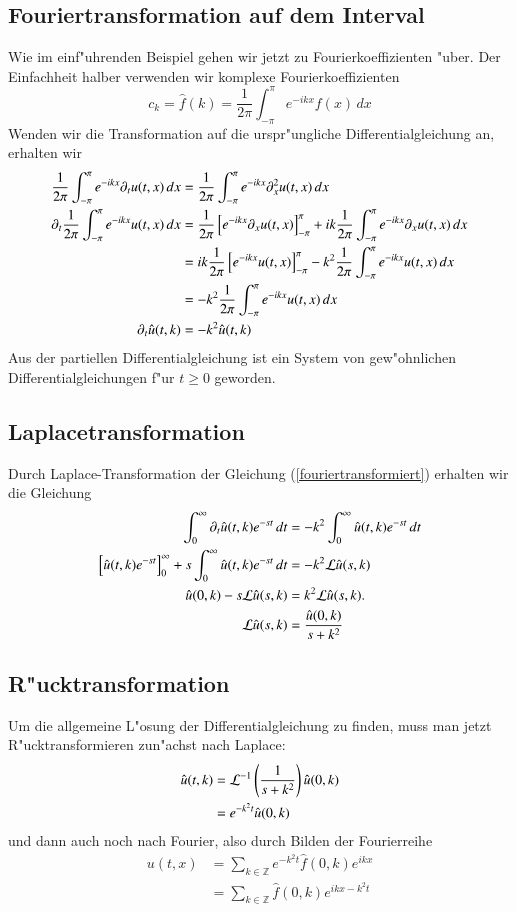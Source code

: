 \subsection{Fouriertransformation auf dem Interval}
Wie im einf"uhrenden Beispiel gehen wir jetzt zu Fourierkoeffizienten
"uber.
Der Einfachheit halber verwenden wir komplexe Fourierkoeffizienten
\[
c_k=\hat f(k)=\frac1{2\pi}\int_{-\pi}^{\pi}e^{-ikx}f(x)\,dx
\]
Wenden wir die Transformation auf die urspr"ungliche Differentialgleichung
an, erhalten wir
\begin{align}
\frac1{2\pi}\int_{-\pi}^{\pi}e^{-ikx}\partial_t u(t,x)\,dx
&=\frac1{2\pi}\int_{-\pi}^{\pi}e^{-ikx}\partial_x^2 u(t,x)\,dx
\notag
\\
\partial_t\frac1{2\pi}\int_{-\pi}^{\pi}e^{-ikx} u(t,x)\,dx
&=
\frac1{2\pi}
\left[
e^{-ikx}\partial_x u(t,x)
\right]_{-\pi}^{\pi}
+
ik\frac1{2\pi}\int_{-\pi}^{\pi}e^{-ikx}\partial_x u(t,x)\,dx
\notag
\\
&=
ik\frac1{2\pi}
\left[
e^{-ikx}u(t,x)
\right]_{-\pi}^{\pi}
-
k^2\frac1{2\pi}\int_{-\pi}^{\pi}e^{-ikx} u(t,x)\,dx
\notag
\\
&=
-
k^2\frac1{2\pi}\int_{-\pi}^{\pi}e^{-ikx} u(t,x)\,dx
\notag
\\
\partial_t\hat u(t,k)&=-k^2 \hat u(t,k)
\label{fouriertransformiert}
\end{align}
Aus der partiellen Differentialgleichung ist ein System von gew"ohnlichen
Differentialgleichungen f"ur $t\ge 0$ geworden.

\subsection{Laplacetransformation}
Durch Laplace-Transformation der Gleichung (\ref{fouriertransformiert})
erhalten wir die Gleichung
\begin{align*}
\int_0^{\infty} \partial_t \hat u(t,k)e^{-st}\,dt
&=
-k^2\int_0^{\infty}\hat u(t,k)e^{-st}\,dt
\\
\left[\hat u(t,k)e^{-st}\right]_0^{\infty}
+
s\int_0^{\infty}\hat u(t,k)e^{-st}\,dt
&=
-k^2{\cal L}\hat u(s,k)
\\
\hat u(0,k)-s{\cal L}\hat u(s,k)&=k^2{\cal L}\hat u(s,k).
\\
{\cal L}\hat u(s,k)&=\frac{\hat u(0,k)}{s+k^2}
\end{align*}

\subsection{R"ucktransformation}
Um die allgemeine L"osung der Differentialgleichung zu finden,
muss man jetzt R"ucktransformieren zun"achst nach Laplace:
\begin{align*}
\hat u(t,k)&={\cal L}^{-1}\left(\frac1{s+k^2}\right)\hat u(0,k)
\\
&=e^{-k^2t}\hat u(0,k)
\end{align*}
und dann auch noch nach Fourier, also durch Bilden der Fourierreihe
\begin{align*}
u(t,x)&=\sum_{k\in\mathbb Z}e^{-k^2t}\hat f(0,k)e^{ikx}
\\
&=\sum_{k\in\mathbb Z}\hat f(0,k)e^{ikx-k^2t}
\end{align*}

